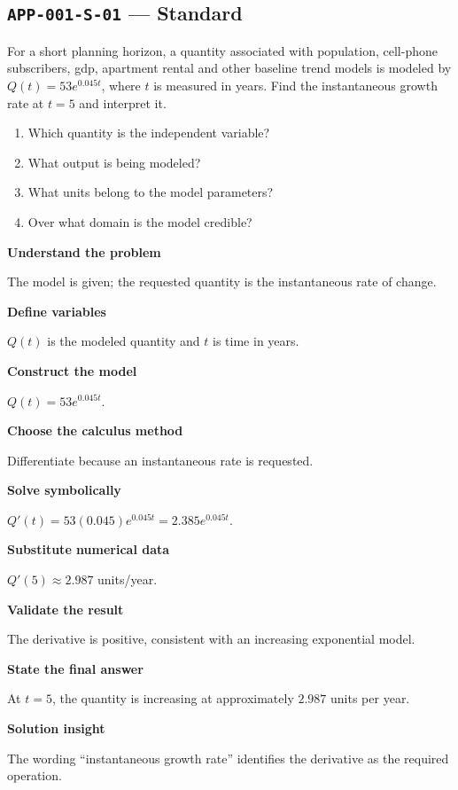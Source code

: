 \documentclass[11pt]{book}
\newcommand{\pid}[1]{\texttt{#1}}
\begin{document}
\subsection*{\pid{APP-001-S-01} — Standard}
\begin{problembox}
For a short planning horizon, a quantity associated with population, cell-phone subscribers, gdp, apartment rental and other baseline trend models is modeled by $Q(t)=53e^{0.045t}$, where $t$ is measured in years. Find the instantaneous growth rate at $t=5$ and interpret it.
\end{problembox}
\begin{promptbox}\begin{enumerate}
\item Which quantity is the independent variable?
\item What output is being modeled?
\item What units belong to the model parameters?
\item Over what domain is the model credible?
\end{enumerate}\end{promptbox}
\begin{solutionbox}
\textbf{Understand the problem}\par The model is given; the requested quantity is the instantaneous rate of change.\par\medskip
\textbf{Define variables}\par $Q(t)$ is the modeled quantity and $t$ is time in years.\par\medskip
\textbf{Construct the model}\par $Q(t)=53e^{0.045t}$.\par\medskip
\textbf{Choose the calculus method}\par Differentiate because an instantaneous rate is requested.\par\medskip
\textbf{Solve symbolically}\par $Q'(t)=53(0.045)e^{0.045t}=2.385e^{0.045t}$.\par\medskip
\textbf{Substitute numerical data}\par $Q'(5)\approx 2.987$ units/year.\par\medskip
\textbf{Validate the result}\par The derivative is positive, consistent with an increasing exponential model.\par\medskip
\textbf{State the final answer}\par At $t=5$, the quantity is increasing at approximately $2.987$ units per year.\par\medskip
\textbf{Solution insight}\par The wording “instantaneous growth rate” identifies the derivative as the required operation.\par\medskip
\end{solutionbox}
\end{document}
